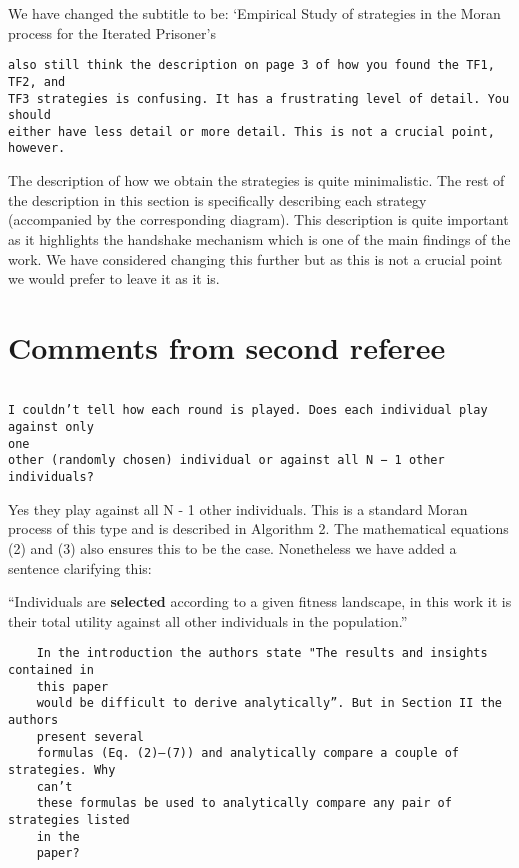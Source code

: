 \documentclass[a4]{article}
\begin{document}
We have changed the subtitle to be: `Empirical Study of strategies in the Moran
process for the Iterated Prisoner's

\begin{verbatim}
also still think the description on page 3 of how you found the TF1, TF2, and
TF3 strategies is confusing. It has a frustrating level of detail. You should
either have less detail or more detail. This is not a crucial point, however.
\end{verbatim}

The description of how we obtain the strategies is quite minimalistic.
The rest of the description in this section is specifically describing each
strategy (accompanied by the corresponding diagram). This description is quite
important as it highlights the handshake mechanism which is one of the main
findings of the work. We have considered changing this further but as this is
not a crucial point we would prefer to leave it as it is.

\section{Comments from second referee}

\begin{verbatim}

I couldn’t tell how each round is played. Does each individual play against only
one
other (randomly chosen) individual or against all N − 1 other individuals?

\end{verbatim}

Yes they play against all N - 1 other individuals. This is a standard Moran
process of this type and is described in
Algorithm 2. The mathematical equations (2) and (3) also ensures this to be the
case. Nonetheless we have added a sentence clarifying this:

``Individuals are \textbf{selected}
according to a given fitness landscape, in this work it is their total utility
against all other individuals in the population.''

\begin{verbatim}
    In the introduction the authors state "The results and insights contained in
    this paper
    would be difficult to derive analytically”. But in Section II the authors
    present several
    formulas (Eq. (2)–(7)) and analytically compare a couple of strategies. Why
    can’t
    these formulas be used to analytically compare any pair of strategies listed
    in the
    paper?
\end{verbatim}
\end{document}
